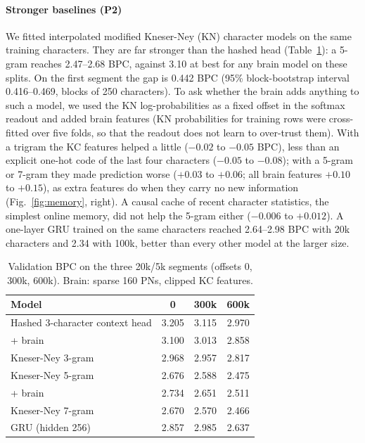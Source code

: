 \documentclass[conference]{IEEEtran}
\begin{document}
\paragraph*{Stronger baselines (P2)} We fitted interpolated modified
Kneser-Ney (KN) character models \cite{kneser1995,chen1999} on the same
training characters. They are far stronger than the hashed head
(Table~\ref{tab:base}): a 5-gram reaches 2.47--2.68 BPC, against 3.10 at best
for any brain model on these splits. On the first segment the gap is 0.442 BPC
(95\% block-bootstrap interval 0.416--0.469, blocks of 250 characters). To ask whether the brain adds anything to
such a model, we used the KN log-probabilities as a fixed offset in the
softmax readout and added brain features (KN probabilities for training rows
were cross-fitted over five folds, so that the readout does not learn to
over-trust them). With a trigram the KC features helped a little ($-0.02$ to
$-0.05$ BPC), less than an explicit one-hot code of the last four characters
($-0.05$ to $-0.08$); with a 5-gram or 7-gram they made prediction worse
($+0.03$ to $+0.06$; all brain features $+0.10$ to $+0.15$), as extra features do when
they carry no new information (Fig.~\ref{fig:memory}, right). A causal cache
of recent character statistics, the simplest online memory, did not help the
5-gram either ($-0.006$ to $+0.012$). A one-layer GRU \cite{cho2014} trained
on the same characters reached 2.64--2.98 BPC with 20k characters and 2.34
with 100k, better than every other model at the larger size.

\begin{table}[t]
\caption{Validation BPC on the three 20k/5k segments (offsets 0, 300k,
600k). Brain: sparse 160 PNs, clipped KC features.}
\label{tab:base}\centering\footnotesize\setlength{\tabcolsep}{3pt}
\begin{tabular}{@{}lccc@{}}\toprule
Model & 0 & 300k & 600k\\\midrule
Hashed 3-character context head & 3.205 & 3.115 & 2.970\\
\quad + brain & 3.100 & 3.013 & 2.858\\
Kneser-Ney 3-gram & 2.968 & 2.957 & 2.817\\
Kneser-Ney 5-gram & 2.676 & 2.588 & 2.475\\
\quad + brain & 2.734 & 2.651 & 2.511\\
Kneser-Ney 7-gram & 2.670 & 2.570 & 2.466\\
GRU (hidden 256) & 2.857 & 2.985 & 2.637\\\bottomrule
\end{tabular}
\end{table}
\end{document}
